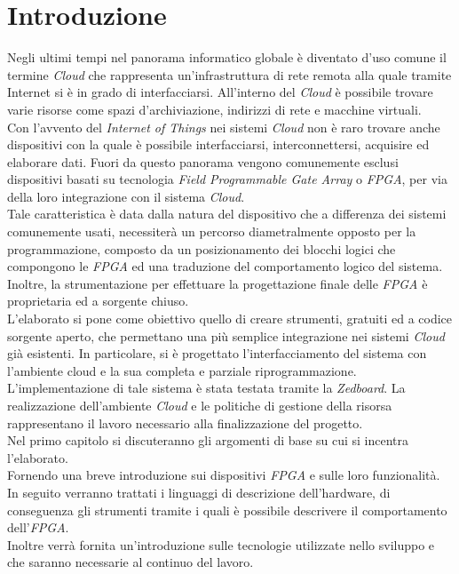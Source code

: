 \chapter{Introduzione}
\label{chap:intro}
Negli ultimi tempi nel panorama informatico globale è diventato d'uso comune il termine \textit{Cloud} che rappresenta un'infrastruttura di rete remota alla quale tramite Internet si è in grado di interfacciarsi. All'interno del \textit{Cloud} è possibile trovare varie risorse come spazi d'archiviazione, indirizzi di rete e macchine virtuali.\\
Con l'avvento del \textit{Internet of Things} nei sistemi \textit{Cloud} non è raro trovare anche dispositivi con la quale è possibile interfacciarsi, interconnettersi, acquisire ed elaborare dati. Fuori da questo panorama vengono comunemente esclusi dispositivi basati su tecnologia \textit{Field Programmable Gate Array} o \textit{FPGA}, per via della loro integrazione con il sistema \textit{Cloud}.\\
Tale caratteristica è data dalla natura del dispositivo che a differenza dei sistemi comunemente usati, necessiterà un percorso diametralmente opposto per la programmazione, composto da un posizionamento dei blocchi logici che compongono le \textit{FPGA} ed una traduzione del comportamento logico del sistema.\\
Inoltre, la strumentazione per effettuare la progettazione finale delle \textit{FPGA} è proprietaria ed a sorgente chiuso.\\
L'elaborato si pone come obiettivo quello di creare strumenti, gratuiti ed a codice sorgente aperto, che permettano una più semplice integrazione nei sistemi \textit{Cloud} già esistenti.
In particolare, si è progettato l'interfacciamento del sistema con l'ambiente cloud e la sua completa e parziale riprogrammazione.
L'implementazione di tale sistema è stata testata tramite la \textit{Zedboard}.
La realizzazione dell'ambiente \textit{Cloud} e le politiche di gestione della risorsa rappresentano il lavoro necessario alla finalizzazione del progetto.\\
Nel primo capitolo si discuteranno gli argomenti di base su cui si incentra l'elaborato.\\
Fornendo una breve introduzione sui dispositivi \textit{FPGA} e sulle loro funzionalità. In seguito verranno trattati i linguaggi di descrizione dell'hardware, di conseguenza gli strumenti tramite i quali è possibile descrivere il comportamento dell'\textit{FPGA}.\\
Inoltre verrà fornita un'introduzione sulle tecnologie utilizzate nello sviluppo e che saranno necessarie al continuo del lavoro.\\

